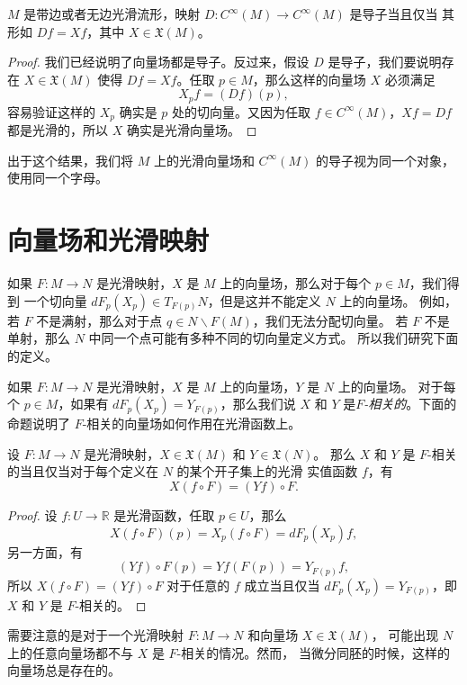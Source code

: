 \documentclass[fontset=none]{Notes}
\begin{document}
\begin{proposition}\label{prop:derivation and vector field}
  $M$ 是带边或者无边光滑流形，映射 $D:C^\infty(M)\to C^\infty(M)$ 是导子当且仅当
  其形如 $Df=Xf$，其中 $X\in \mathfrak X(M)$。
\end{proposition}
\begin{proof}
  我们已经说明了向量场都是导子。反过来，假设 $D$ 是导子，我们要说明存在 $X\in \mathfrak X(M)$
  使得 $Df=Xf$。任取 $p\in M$，那么这样的向量场 $X$ 必须满足
  \[
    X_pf=(Df)(p),
  \]
  容易验证这样的 $X_p$ 确实是 $p$ 处的切向量。又因为任取 $f\in C^\infty(M)$，$Xf=Df$
  都是光滑的，所以 $X$ 确实是光滑向量场。
\end{proof}

出于这个结果，我们将 $M$ 上的光滑向量场和 $C^\infty(M)$ 的导子视为同一个对象，
使用同一个字母。

\section{向量场和光滑映射}

如果 $F:M\to N$ 是光滑映射，$X$ 是 $M$ 上的向量场，那么对于每个 $p\in M$，我们得到
一个切向量 $dF_p(X_p)\in T_{F(p)}N$，但是这并不能定义 $N$ 上的向量场。
例如，若 $F$ 不是满射，那么对于点 $q\in N \smallsetminus F(M)$，我们无法分配切向量。
若 $F$ 不是单射，那么 $N$ 中同一个点可能有多种不同的切向量定义方式。
所以我们研究下面的定义。

如果 $F:M\to N$ 是光滑映射，$X$ 是 $M$ 上的向量场，$Y$ 是 $N$ 上的向量场。
对于每个 $p\in M$，如果有 $dF_p(X_p)=Y_{F(p)}$，那么我们说 $X$ 和 $Y$
是\emph{$F$-相关的}。下面的命题说明了 $F$-相关的向量场如何作用在光滑函数上。

\begin{proposition}
  设 $F:M\to N$ 是光滑映射，$X\in \mathfrak X(M)$ 和 $Y\in \mathfrak X(N)$。
  那么 $X$ 和 $Y$ 是 $F$-相关的当且仅当对于每个定义在 $N$ 的某个开子集上的光滑
  实值函数 $f$，有
  \[
    X(f\circ F)=(Yf)\circ F.
  \]
\end{proposition}
\begin{proof}
  设 $f:U\to \mathbb{R}$ 是光滑函数，任取 $p\in U$，那么
  \[
    X(f\circ F)(p)=X_p(f\circ F)=dF_p(X_p)f,
  \]
  另一方面，有
  \[
    (Yf)\circ F(p)=Yf(F(p))=Y_{F(p)}f,
  \]
  所以 $X(f\circ F)=(Yf)\circ F$ 对于任意的 $f$ 成立当且仅当
  $dF_p(X_p)=Y_{F(p)}$，即 $X$ 和 $Y$ 是 $F$-相关的。
\end{proof}

需要注意的是对于一个光滑映射 $F:M\to N$ 和向量场 $X\in \mathfrak X(M)$，
可能出现 $N$ 上的任意向量场都不与 $X$ 是 $F$-相关的情况。然而， 
当微分同胚的时候，这样的向量场总是存在的。
\end{document}
